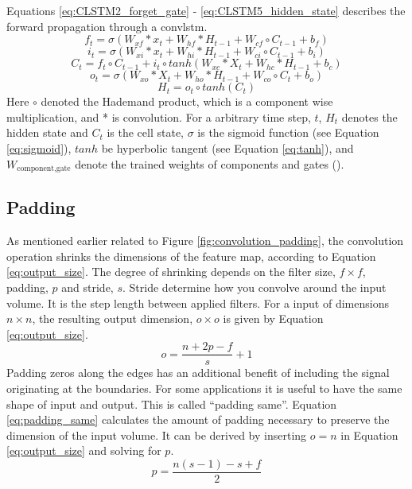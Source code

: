 Equations \eqref{eq:CLSTM2_forget_gate} - \eqref{eq:CLSTM5_hidden_state} describes the forward propagation through a \acrshort{convlstm}. 
\begin{equation} \label{eq:CLSTM2_forget_gate}
        f_t = \sigma \left( W_{xf}*x_t + W_{hf}*H_{t-1} + W_{cf}\circ C_{t-1}+b_f \right)
\end{equation}
\begin{equation} \label{eq:CLSTM1_input_gate}
    i_t = \sigma \left( W_{xi}*x_t + W_{hi}*H_{t-1} + W_{ci}\circ C_{t-1}+b_i \right) 
\end{equation}
\begin{equation} \label{eq:CLSTM3_cellstate}
        C_t = f_t \circ C_{t-1} +i_t\circ tanh\left( W_{xc}*X_t + W_{hc}*H_{t-1} + b_c \right)
\end{equation}
\begin{equation} \label{eq:CLSTM4_output_gate}
        o_t = \sigma \left( W_{xo}*X_t + W_{ho}*H_{t-1} + W_{co}\circ C_{t}+b_o \right)
\end{equation}
\begin{equation} \label{eq:CLSTM5_hidden_state}
        H_t = o_t \circ tanh \left( C_t \right)
\end{equation}
Here $\circ$ denoted the Hademand product, which is a component wise multiplication, and * is convolution. For a arbitrary time step, $t$, $H_{t}$ denotes the hidden state and $C_{t}$ is the cell state, $\sigma$ is the sigmoid function (see Equation \eqref{eq:sigmoid}), $tanh$ be hyperbolic tangent (see Equation \eqref{eq:tanh}), and $W_{\text{component}, \text{gate}}$ denote the trained weights of components and gates (\cite{precip_nowcasting}). 

\subsection{Padding} \label{sec:padding}
As mentioned earlier related to Figure \ref{fig:convolution_padding}, the convolution operation shrinks the dimensions of the feature map, according to Equation \eqref{eq:output_size}. The degree of shrinking depends on the filter size, $f\times f$, padding, $p$ and stride, $s$. Stride determine how you convolve around the input volume. It is the step length between applied filters. For a input of dimensions $n\times n$, the resulting output dimension, $o\times o$ is given by Equation \eqref{eq:output_size}.
\begin{equation} \label{eq:output_size}
    o = \frac{n+2p-f}{s} + 1
\end{equation}
Padding zeros along the edges has an additional benefit of including the signal originating at the boundaries. For some applications it is useful to have the same shape of input and output. This is called ``padding same''. Equation \eqref{eq:padding_same} calculates the amount of padding necessary to preserve the dimension of the input volume. It can be derived by inserting $o=n$ in Equation \ref{eq:output_size} and solving for $p$.
\begin{equation} \label{eq:padding_same}
    p = \frac{n\left(s-1\right)-s+f}{2}
\end{equation}


